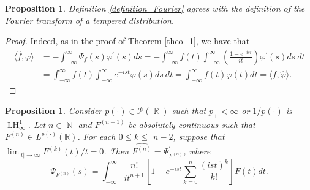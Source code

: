 \documentclass[11pt,reqno]{amsart}
\newtheorem{prop}[theorem]{Proposition}
\theoremstyle{definition}
\theoremstyle{definition}
\theoremstyle{definition}
\DeclareMathOperator{\R}{\mathbb{R}}
\DeclareMathOperator{\N}{\mathbb{N}}
\newcommand{\p}{p(\cdot)}
\newcommand{\LH}{\operatorname{LH}_\infty^1}
\begin{document}
\begin{prop}
    Definition \ref{definition_Fourier} agrees with the definition of the Fourier transform of a tempered distribution.
\end{prop}
\begin{proof}
    Indeed, as in the proof of Theorem \ref{theo_1}, we have that
\begin{align*}
\langle\widehat{f},\varphi\rangle&= -\int_{-\infty}^{\infty} \Psi_f(s) \varphi^{\prime}(s) {d} s=-\int_{-\infty}^{\infty} f(t) \int_{-\infty}^{\infty}\left(\frac{1-{e}^{-{i} s t}}{{i} t}\right) \varphi^{\prime}(s) {d} s {~d} t \\
& =\int_{-\infty}^{\infty} f(t) \int_{-\infty}^{\infty} {e}^{-{i} s t} \varphi(s) {d} s {~d} t=\int_{-\infty}^{\infty} f(t) \widehat{\varphi}(t) {d} t=\langle f,\widehat{\varphi}\rangle.
\end{align*}
\end{proof}
\begin{prop}
     Consider $\p\in\mathcal{P}(\R)$ such that $p_{+}<\infty$ or $1/\p$ is $\LH$. Let $n\in\N$ and $F^{(n-1)}$ be absolutely continuous such that $F^{(n)} \in L^{\p}(\mathbb{R})$. For each $0 \leqslant k \leqslant$ $n-2$, suppose that $\lim _{|t| \rightarrow \infty} F^{(k)}(t) / t=0$. Then $\widehat{F^{(n)}}=\Psi_{F^{(n)}}^{\prime}$, where
\begin{equation}\label{eq_F^(n)}
\Psi_{F^{(n)}}(s)=\int_{-\infty}^{\infty} \frac{n!}{{i} t^{n+1}}\left[1-{e}^{-{i} s t} \sum_{k=0}^n \frac{({i} s t)^k}{k!}\right] F(t) {d} t.
\end{equation}
\end{prop}
\end{document}
